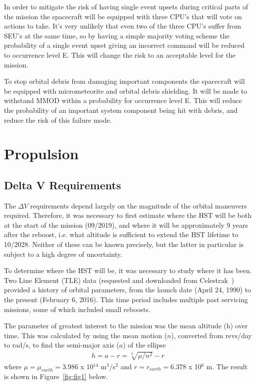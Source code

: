 \documentclass[paper=letter, fontsize=11pt]{scrartcl} %
\numberwithin{equation}{section} %
\numberwithin{figure}{section} %
\numberwithin{table}{section} %
\begin{document}
In order to mitigate the risk of having single event upsets during critical parts of the mission the spacecraft will be equipped with three CPU's that will vote on actions to take. It's very unlikely that even two of the three CPU's suffer from SEU's at the same time, so by having a simple majority voting scheme the probability of a single event upset giving an incorrect command will be reduced to occurrence level E. This will change the risk to an acceptable level for the mission.

To stop orbital debris from damaging important components the spacecraft will be equipped with micrometeorite and orbital debris shielding. It will be made to withstand MMOD within a probability for occurrence level E. This will reduce the probability of an important system component being hit with debris, and reduce the risk of this failure mode.


\section{Propulsion}

\subsection{Delta V Requirements}
The $\Delta V$ requirements depend largely on the magnitude of the orbital maneuvers required. Therefore, it was necessary to first estimate where the HST will be both at the start of the mission (09/2019), and where it will be approximately 9 years after the reboost, i.e. what altitude is sufficient to extend the HST lifetime to 10/2028. Neither of these can be known precisely, but the latter in particular is subject to a high degree of uncertainty.

To determine where the HST will be, it was necessary to study where it has been. Two Line Element (TLE) data (requested and downloaded from Celestrak~\cite{celestrak}) provided a history of orbital parameters, from the launch date (April 24, 1990) to the present (February 6, 2016). This time period includes multiple past servicing missions, some of which included small reboosts.

The parameter of greatest interest to the mission was the mean altitude (h) over time. This was calculated by using the mean motion ($n$), converted from revs/day to rad/s, to find the semi-major axis ($a$) of the ellipse
\begin{align*}
    h = a - r = \sqrt[3]{\mu/n^2} - r
\end{align*}
where $\mu = \mu_{earth} = 3.986$ x 10$^14$ m$^3$/s$^2$ and $r = r_{earth} = 6.378$ x 10$^6$ m. The result is shown in Figure~\ref{fig:fig1} below.
\end{document}
